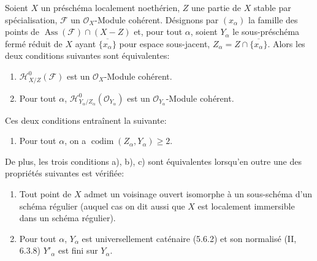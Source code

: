 \begin{proposition}[5.11.1]
\label{IV.2.s5.11.1-fr}
Soient $X$ un préschéma localement noethérien, $Z$ une partie de $X$ stable par
spécialisation, $\mathcal F$ un $\mathcal O_X$-Module cohérent. Désignons par
$(x_\alpha)$ la famille des points de
$\operatorname{Ass}(\mathcal F)\cap(X-Z)$ et, pour tout $\alpha$, soient
$Y_\alpha$ le sous-préschéma fermé réduit de $X$ ayant
$\overline{\{x_\alpha\}}$ pour espace sous-jacent,
$Z_\alpha=Z\cap\overline{\{x_\alpha\}}$. Alors les deux conditions suivantes
sont équivalentes:
\begin{enumerate}
\item[a)] $\mathcal H^0_{X/Z}(\mathcal F)$ est un $\mathcal O_X$-Module
cohérent.
\item[b)] Pour tout $\alpha$,
$\mathcal H^0_{Y_\alpha/Z_\alpha}(\mathcal O_{Y_\alpha})$ est un
$\mathcal O_{Y_\alpha}$-Module cohérent.
\end{enumerate}
Ces deux conditions entraînent la suivante:
\begin{enumerate}
\item[c)] Pour tout $\alpha$, on a
$\operatorname{codim}(Z_\alpha,Y_\alpha)\geq2$.
\end{enumerate}
De plus, les trois conditions a), b), c) sont équivalentes lorsqu'en outre une
des propriétés suivantes est vérifiée:
\begin{enumerate}
\item[(i)] Tout point de $X$ admet un voisinage ouvert isomorphe à un
sous-schéma d'un schéma régulier (auquel cas on dit aussi que $X$ est
localement immersible dans un schéma régulier).
\item[(ii)] Pour tout $\alpha$, $Y_\alpha$ est universellement caténaire
(5.6.2) et son normalisé (II, 6.3.8) $Y'_\alpha$ est fini sur $Y_\alpha$.
\end{enumerate}
\end{proposition}

